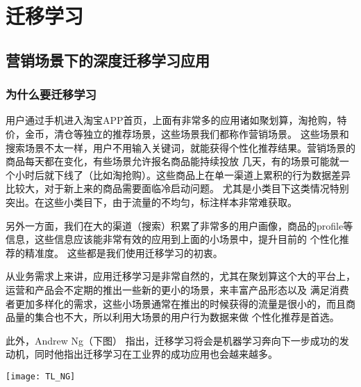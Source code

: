 
\chapter{迁移学习}

\graphicspath{ {FIG/} }

\thispagestyle{empty}

\setlength{\fboxrule}{0pt}\setlength{\fboxsep}{0cm}
\noindent\shadowbox{
\begin{tcolorbox}[arc=0mm,colback=lightblue,colframe=darkblue,title=学习目标与要求]

\end{tcolorbox}}
\setlength{\fboxrule}{1pt}\setlength{\fboxsep}{4pt} 


\section{营销场景下的深度迁移学习应用} 

\subsection{为什么要迁移学习}

用户通过手机进入淘宝APP首页，上面有非常多的应用诸如聚划算，淘抢购，特价，金币，清仓等独立的推荐场景，这些场景我们都称作营销场景。
这些场景和搜索场景不太一样，用户不用输入关键词，就能获得个性化推荐结果。营销场景的商品每天都在变化，有些场景允许报名商品能持续投放
几天，有的场景可能就一个小时后就下线了（比如淘抢购）。这些商品上在单一渠道上累积的行为数据差异比较大，对于新上来的商品需要面临冷启动问题。
尤其是小类目下这类情况特别突出。在这些小类目下，由于流量的不均匀，标注样本非常难获取。

另外一方面，我们在大的渠道（搜索）积累了非常多的用户画像，商品的profile等信息，这些信息应该能非常有效的应用到上面的小场景中，提升目前的
个性化推荐的精准度。
这些都是我们使用迁移学习的初衷。 

从业务需求上来讲，应用迁移学习是非常自然的，尤其在聚划算这个大的平台上，运营和产品会不定期的推出一些新的更小的场景，来丰富产品形态以及
满足消费者更加多样化的需求，这些小场景通常在推出的时候获得的流量是很小的，而且商品量的集合也不大，所以利用大场景的用户行为数据来做
个性化推荐是首选。

此外，Andrew Ng（下图） 指出，迁移学习将会是机器学习奔向下一步成功的发动机，同时他指出迁移学习在工业界的成功应用也会越来越多。

\texttt{[image: TL\_NG]}

